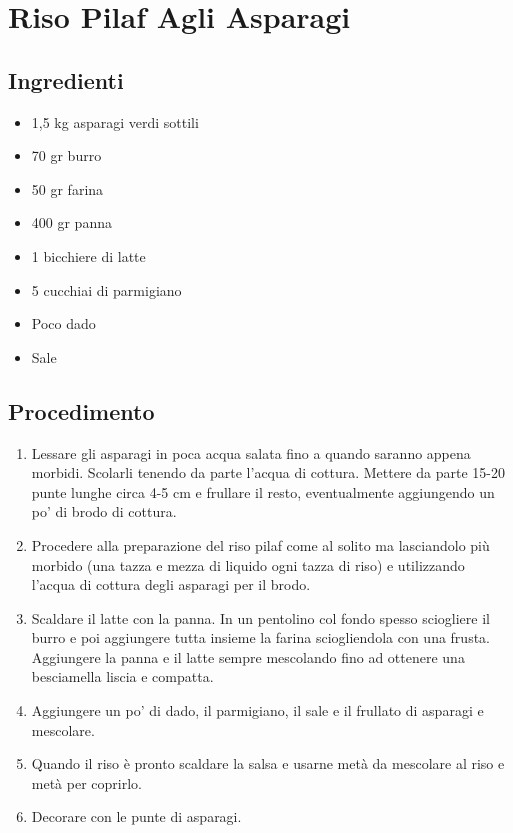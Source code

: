 \section{Riso Pilaf Agli Asparagi}
\subsection{Ingredienti}
\begin{itemize}
\item 1,5 kg asparagi verdi sottili  
\item 70 gr burro  
\item 50 gr farina  
\item 400 gr panna  
\item 1 bicchiere di latte  
\item 5 cucchiai di parmigiano  
\item Poco dado  
\item Sale
\end{itemize}
\subsection{Procedimento}
\begin{enumerate}
\item  Lessare gli asparagi in poca acqua salata fino a quando saranno appena morbidi. Scolarli tenendo da parte l'acqua di cottura. Mettere da parte 15-20 punte lunghe circa 4-5 cm e frullare il resto, eventualmente aggiungendo un po' di brodo di cottura.  
\item  Procedere alla preparazione del riso pilaf come al solito ma lasciandolo più morbido (una tazza e mezza di liquido ogni tazza di riso) e utilizzando l'acqua di cottura degli asparagi per il brodo.  
\item  Scaldare il latte con la panna. In un pentolino col fondo spesso sciogliere il burro e poi aggiungere tutta insieme la farina sciogliendola con una frusta. Aggiungere la panna e il latte sempre mescolando fino ad ottenere una besciamella liscia e compatta.   
\item  Aggiungere un po' di dado, il parmigiano, il sale e il frullato di asparagi e mescolare.  
\item  Quando il riso è pronto scaldare la salsa e usarne metà da mescolare al riso e metà per coprirlo.   
\item  Decorare con le punte di asparagi.
\end{enumerate}
